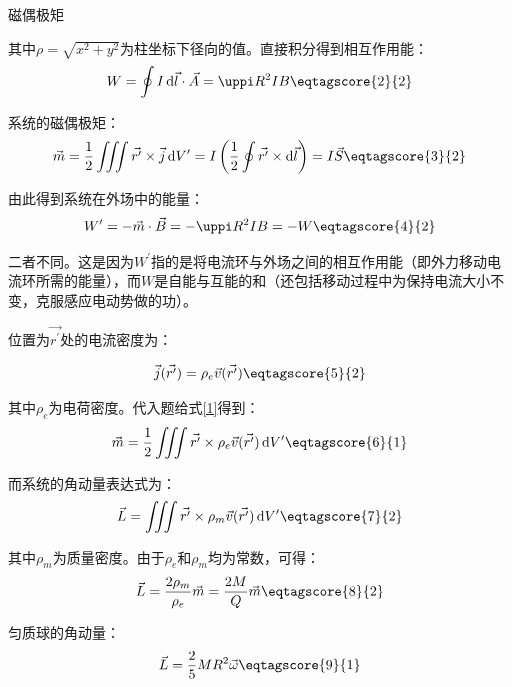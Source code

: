 \documentclass[answer]{cphos}
\begin{document}
\begin{problem}[50]{磁偶极矩}
\begin{solution}
其中\(\rho=\sqrt{x^2+y^2}\)为柱坐标下径向的值。直接积分得到相互作用能：
\begin{equation}
	W=\oint I\,\mathrm{d}\vec{l}\cdot\vec{A}=\uppi R^2 IB\eqtagscore{2}{2}
\end{equation}

系统的磁偶极矩：
\begin{equation}
	\vec{m}=\frac{1}{2}\iiint\vec{r^\prime}\times\vec{j}\,\mathrm{d}V^\prime=I\left(\frac{1}{2}\oint\vec{r^\prime}\times\mathrm{d}\vec{l}\right)=I\vec{S}\eqtagscore{3}{2}
\end{equation}

由此得到系统在外场中的能量：
\begin{equation}
	W^\prime=-\vec{m}\cdot\vec{B}=-\uppi R^2IB=-W\eqtagscore{4}{2}
\end{equation}

二者不同。这是因为\(W^\prime\)指的是将电流环与外场之间的相互作用能（即外力移动电流环所需的能量），而\(W\)是自能与互能的和（还包括移动过程中为保持电流大小不变，克服感应电动势做的功）。


位置为\(\vec{r^\prime}\)处的电流密度为：

\begin{equation}
	\vec{j}(\vec{r^\prime})=\rho_e\vec{v}(\vec{r^\prime})\eqtagscore{5}{2}
\end{equation}

其中\(\rho_e\)为电荷密度。代入题给式\ref{1}得到：
\begin{equation}
	\vec{m}=\frac{1}{2}\iiint\vec{r^\prime}\times\rho_e\vec{v}(\vec{r^\prime})\,\mathrm{d}V^\prime\eqtagscore{6}{1}
\end{equation}

而系统的角动量表达式为：
\begin{equation}
	\vec{L}=\iiint\vec{r^\prime}\times\rho_m\vec{v}(\vec{r^\prime})\,\mathrm{d}V^\prime\eqtagscore{7}{2}
\end{equation}

其中\(\rho_m\)为质量密度。由于\(\rho_e\)和\(\rho_m\)均为常数，可得：
\begin{equation}
	\vec{L}=\frac{2\rho_m}{\rho_e}\vec{m}=\frac{2M}{Q}\vec{m}\eqtagscore{8}{2}
\end{equation}

匀质球的角动量：
\begin{equation}
	\vec{L}=\frac{2}{5}MR^2\vec{\omega}\eqtagscore{9}{1}
\end{equation}


\end{solution}
\end{problem}
\end{document}
